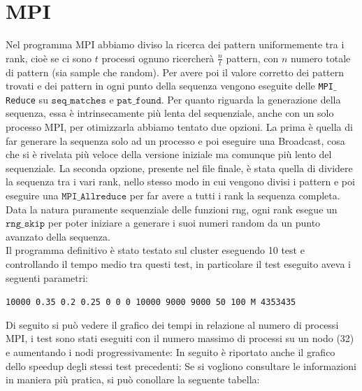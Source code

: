 \documentclass[12pt,openany]{report}
\begin{document}
\section{MPI}
Nel programma MPI abbiamo diviso la ricerca dei pattern uniformemente tra i rank, cioè se ci sono $t$ processi ognuno ricercherà $\frac{n}{t}$ pattern, con $n$ numero totale di pattern (sia sample che random). Per avere poi il valore corretto dei pattern trovati e dei pattern in ogni punto della sequenza vengono eseguite delle \texttt{MPI$\_$Reduce} su $\texttt{seq$\_$matches}$ e $\texttt{pat$\_$found}$. Per quanto riguarda la generazione della sequenza, essa è intrinsecamente più lenta del sequenziale, anche con un solo processo MPI, per otimizzarla abbiamo tentato due opzioni. La prima è quella di far generare la sequenza solo ad un processo e poi eseguire una Broadcast, cosa che si è rivelata più veloce della versione iniziale ma comunque più lento del sequenziale. La seconda opzione, presente nel file finale, è stata quella di dividere la sequenza tra i vari rank, nello stesso modo in cui vengono divisi i pattern e poi eseguire una $\texttt{MPI$\_$Allreduce}$ per far avere a tutti i rank la sequenza completa. Data la natura puramente sequenziale delle funzioni rng, ogni rank esegue un $\texttt{rng$\_$skip}$ per poter iniziare a generare i suoi numeri random da un punto avanzato della sequenza.\\
Il programma definitivo è stato testato sul cluster eseguendo 10 test e controllando il tempo medio tra questi test, in particolare il test eseguito aveva i seguenti parametri:
\begin{center}
    \texttt{10000 0.35 0.2 0.25 0 0 0 10000 9000 9000 50 100 M 4353435}
\end{center}
Di seguito si può vedere il grafico dei tempi in relazione al numero di processi MPI, i test sono stati eseguiti con il numero massimo di processi su un nodo (32) e aumentando i nodi progressivamente:
In seguito è riportato anche il grafico dello speedup degli stessi test precedenti:
Se si vogliono consultare le informazioni in maniera più pratica, si può conollare la seguente tabella:
\end{document}
